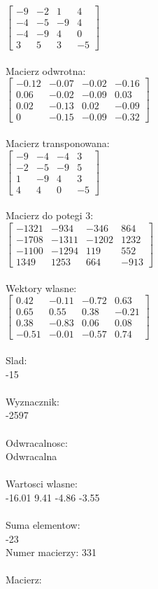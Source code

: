 \documentclass[a4paper,12pt]{article}
\begin{document}
$\begin{bmatrix} -9&-2&1&4\\-4&-5&-9&4\\-4&-9&4&0\\3&5&3&-5 \end{bmatrix}$
\\
\\
Macierz odwrotna:\\

$\begin{bmatrix} -0.12&-0.07&-0.02&-0.16\\0.06&-0.02&-0.09&0.03\\0.02&-0.13&0.02&-0.09\\0&-0.15&-0.09&-0.32 \end{bmatrix}$
\\
\\
Macierz transponowana:\\

$\begin{bmatrix} -9&-4&-4&3\\-2&-5&-9&5\\1&-9&4&3\\4&4&0&-5 \end{bmatrix}$
\\
\\
Macierz do potegi 3:\\

$\begin{bmatrix} -1321&-934&-346&864\\-1708&-1311&-1202&1232\\-1100&-1294&119&552\\1349&1253&664&-913 \end{bmatrix}$
\\
\\
Wektory wlasne:\\

$\begin{bmatrix} 0.42&-0.11&-0.72&0.63\\0.65&0.55&0.38&-0.21\\0.38&-0.83&0.06&0.08\\-0.51&-0.01&-0.57&0.74 \end{bmatrix}$
\\
\\
Slad:\\
-15
\\
\\
Wyznacznik:\\
-2597
\\
\\
Odwracalnosc:\\
Odwracalna
\\
\\
Wartosci wlasne:\\
-16.01 9.41 -4.86 -3.55
\\
\\
Suma elementow:\\
-23
\\
\newpage
Numer macierzy:
331
\\
\\
Macierz:\\
\end{document}
